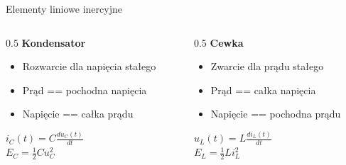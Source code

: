 \begin{frame}{Elementy liniowe inercyjne}
	\begin{columns}
		\begin{column}{0.5\textwidth}
			\textbf{Kondensator}
			\begin{itemize}
				\item[\bt] Rozwarcie dla napięcia stałego
				\item[\bt] Prąd == pochodna napięcia
				\item[\bt] Napięcie == całka prądu
			\end{itemize}
			$i_C(t) = C \frac{d u_C(t)}{dt}$\\
			$E_C = \frac{1}{2} C u_C^2$
		\end{column}
		\begin{column}{0.5\textwidth}
			\textbf{Cewka}
			\begin{itemize}
				\item[\bt] Zwarcie dla prądu stałego
				\item[\bt] Prąd == całka napięcia
				\item[\bt] Napięcie == pochodna prądu
			\end{itemize}
			$u_L(t) = L \frac{d i_L(t)}{dt}$\\
			$E_L = \frac{1}{2} L i_L^2$
		\end{column}
	\end{columns}
\end{frame}

